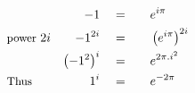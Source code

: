 \begin{alignat*}{5}
&\,&-1\quad&=\quad&&e^{i\pi}\\
&\small\text{power }\normalsize 2i&-1^{2i}\quad&=&&\left(e^{i\pi}\right)^{2i}\\
&\,&\left(-1^2\right)^i\quad&=&&e^{2\pi.i^2}\\
&\small\text{Thus}&1^i\quad&=&&e^{-2\pi}
\end{alignat*}
